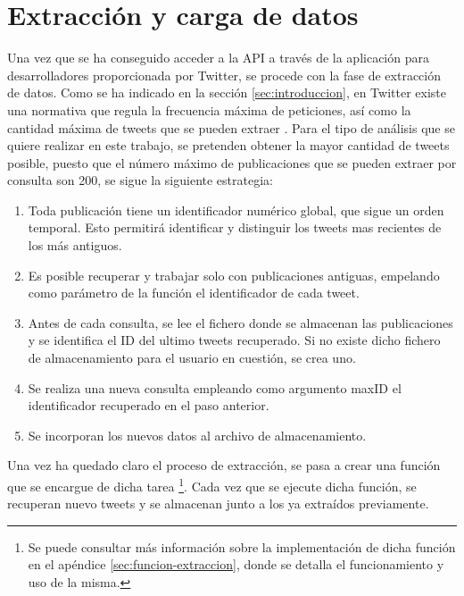 

\section{Extracción y carga de datos}
\label{sec:extraccion-carga-datos}

Una vez que se ha conseguido acceder a la API a través de la aplicación para desarrolladores proporcionada por Twitter, se procede 
con la fase de extracción de datos. Como se ha indicado en la sección \ref{sec:introduccion}, en Twitter existe una normativa 
que regula la frecuencia máxima de peticiones, así como la cantidad máxima de tweets que se pueden extraer \cite{rate_limit}. Para 
el tipo de análisis que se quiere realizar en este trabajo, se pretenden obtener la mayor cantidad de tweets posible, puesto que el 
número máximo de publicaciones que se pueden extraer por consulta son 200, se sigue la siguiente estrategia:

\begin{enumerate}
	\item Toda publicación  tiene un identificador numérico global, que sigue un orden temporal. Esto permitirá identificar y distinguir 
	los tweets mas recientes de los más antiguos.

	\item Es posible recuperar y trabajar solo con publicaciones antiguas, empelando como parámetro de la función el identificador de 
	cada tweet.

	\item Antes de cada consulta, se lee el fichero donde se almacenan las publicaciones y se identifica el ID del ultimo tweets
	recuperado. Si no existe dicho fichero de almacenamiento para el usuario en cuestión, se crea uno.

	\item Se realiza una nueva consulta empleando como argumento maxID el identificador recuperado en el paso anterior.

	\item Se incorporan los nuevos datos al archivo de almacenamiento.
\end{enumerate} 

Una vez ha quedado claro el proceso de extracción, se pasa a crear una función que se encargue de dicha tarea \footnote{Se puede consultar 
más información sobre la implementación de dicha función en el apéndice \ref{sec:funcion-extraccion}, donde se detalla el funcionamiento y uso 
de la misma.}. Cada vez que se ejecute dicha función, se recuperan nuevo tweets y se almacenan junto a los ya extraídos previamente.







